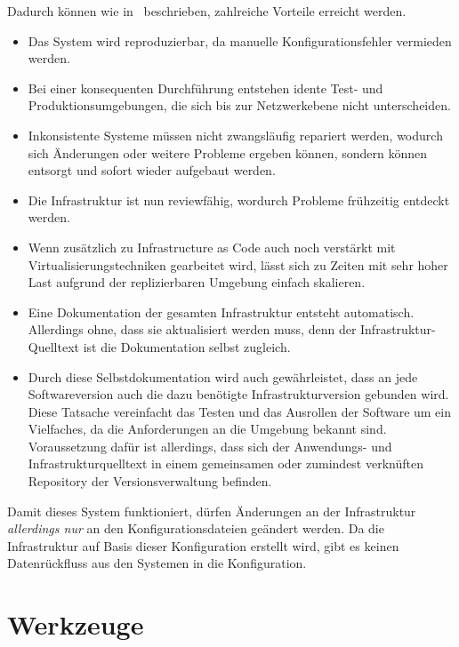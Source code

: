 Dadurch können wie in~\autocite[64\psqq]{Wolff201604} beschrieben, zahlreiche Vorteile erreicht werden.
\begin{itemize}
    \item Das System wird reproduzierbar, da manuelle Konfigurationsfehler vermieden werden.
    \item Bei einer konsequenten Durchführung entstehen idente Test- und Produktionsumgebungen, die sich bis zur Netzwerkebene nicht unterscheiden.
    \item Inkonsistente Systeme müssen nicht zwangsläufig repariert werden, wodurch sich Änderungen oder weitere Probleme ergeben können, sondern können entsorgt und sofort wieder aufgebaut werden.
    \item Die Infrastruktur ist nun reviewfähig, wordurch Probleme frühzeitig entdeckt werden.
    \item Wenn zusätzlich zu Infrastructure as Code auch noch verstärkt mit Virtualisierungstechniken gearbeitet wird, lässt sich zu Zeiten mit sehr hoher Last aufgrund der replizierbaren Umgebung einfach skalieren.
    \item Eine Dokumentation der gesamten Infrastruktur entsteht automatisch. Allerdings ohne, dass sie aktualisiert werden muss, denn der Infrastruktur-Quelltext ist die Dokumentation selbst zugleich.
    \item Durch diese Selbstdokumentation wird auch gewährleistet, dass an jede Softwareversion auch die dazu benötigte Infrastrukturversion gebunden wird. Diese Tatsache vereinfacht das Testen und das Ausrollen der Software um ein Vielfaches, da die Anforderungen an die Umgebung bekannt sind. Voraussetzung dafür ist allerdings, dass sich der Anwendungs- und Infrastrukturquelltext in einem gemeinsamen oder zumindest verknüften Repository der Versionsverwaltung befinden.
\end{itemize}
Damit dieses System funktioniert, dürfen Änderungen an der Infrastruktur \emph{allerdings nur} an den Konfigurationsdateien geändert werden. Da die Infrastruktur auf Basis dieser Konfiguration erstellt wird, gibt es keinen Datenrückfluss aus den Systemen in die Konfiguration.


\section{Werkzeuge}
\label{sec:konfigurationswerkzeuge}
